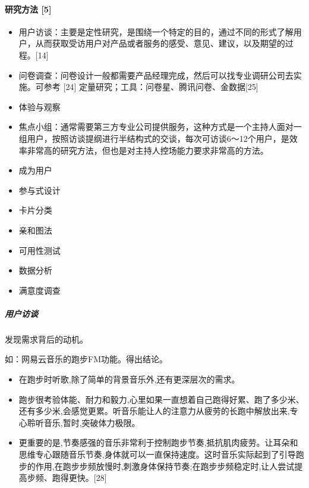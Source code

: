 \documentclass[letterpaper,10pt,english]{sphinxmanual}
\begin{document}
\paragraph{研究方法 {[}5{]}}
\label{\detokenize{chapter_knowledge/users_analysis:id28}}\begin{itemize}
\item {} 
用户访谈：主要是定性研究，是围绕一个特定的目的，通过不同的形式了解用户，从而获取受访用户对产品或者服务的感受、意见、建议，以及期望的过程。{[}14{]}

\item {} 
问卷调查：问卷设计一般都需要产品经理完成，然后可以找专业调研公司去实施。可参考
{[}24{]} 定量研究；工具：问卷星、腾讯问卷、金数据{[}25{]}

\item {} 
体验与观察

\item {} 
焦点小组：通常需要第三方专业公司提供服务，这种方式是一个主持人面对一组用户，按照访谈提纲进行半结构式的交谈，每次可访谈6～12个用户，是效率非常高的研究方法，但也是对主持人控场能力要求非常高的方法。

\item {} 
成为用户

\item {} 
参与式设计

\item {} 
卡片分类

\item {} 
亲和图法

\item {} 
可用性测试

\item {} 
数据分析

\item {} 
满意度调查

\end{itemize}


\subparagraph{用户访谈}
\label{\detokenize{chapter_knowledge/users_analysis:id29}}
发现需求背后的动机。

如：网易云音乐的跑步FM功能。得出结论。
\begin{itemize}
\item {} 
在跑步时听歌,除了简单的背景音乐外,还有更深层次的需求。

\item {} 
跑步很考验体能、耐力和毅力,心里如果一直想着自己跑得好累、跑了多少米、还有多少米,会感觉更累。听音乐能让人的注意力从疲劳的长跑中解放出来,专心聆听音乐,暂时,突破体力极限。

\item {} 
更重要的是,节奏感强的音乐非常利于控制跑步节奏,抵抗肌肉疲劳。让耳朵和思维专心跟随音乐节奏,身体就可以一直保持速度。这时音乐实际起到了引导跑步的作用,在跑步步频放慢时,刺激身体保持节奏;在跑步步频稳定时,让人尝试提高步频、跑得更快。{[}28{]}

\end{itemize}
\end{document}
